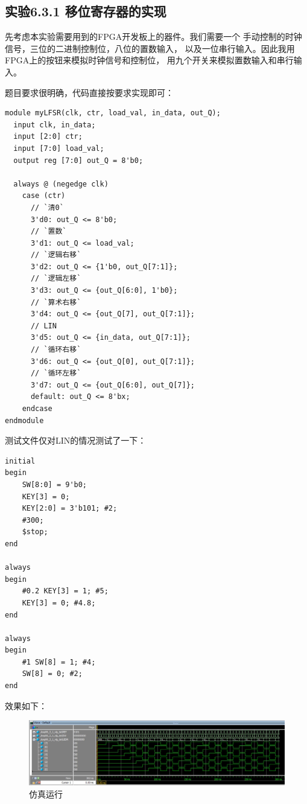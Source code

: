 \documentclass[12pt,a4paper,UTF8]{article}
\begin{document}
\subsection{实验6.3.1 移位寄存器的实现}
先考虑本实验需要用到的FPGA开发板上的器件。我们需要一个
手动控制的时钟信号，三位的二进制控制位，八位的置数输入，
以及一位串行输入。因此我用FPGA上的按钮来模拟时钟信号和控制位，
用九个开关来模拟置数输入和串行输入。

题目要求很明确，代码直接按要求实现即可：
\begin{lstlisting}[style=verilog-style]
module myLFSR(clk, ctr, load_val, in_data, out_Q);
  input clk, in_data;
  input [2:0] ctr;
  input [7:0] load_val;
  output reg [7:0] out_Q = 8'b0;

  always @ (negedge clk)
    case (ctr)
      // `清0`
      3'd0: out_Q <= 8'b0;
      // `置数`
      3'd1: out_Q <= load_val;
      // `逻辑右移`
      3'd2: out_Q <= {1'b0, out_Q[7:1]};
      // `逻辑左移`
      3'd3: out_Q <= {out_Q[6:0], 1'b0};
      // `算术右移`
      3'd4: out_Q <= {out_Q[7], out_Q[7:1]};
      // LIN
      3'd5: out_Q <= {in_data, out_Q[7:1]};
      // `循环右移`
      3'd6: out_Q <= {out_Q[0], out_Q[7:1]};
      // `循环左移`
      3'd7: out_Q <= {out_Q[6:0], out_Q[7]};
      default: out_Q <= 8'bx;
    endcase
endmodule
\end{lstlisting}

测试文件仅对LIN的情况测试了一下：
\begin{lstlisting}[style=verilog-style]
initial                                                
begin                                                  
	SW[8:0] = 9'b0;
	KEY[3] = 0;
	KEY[2:0] = 3'b101; #2;
	#300;
	$stop;
end

always
begin                                                  
	#0.2 KEY[3] = 1; #5;
	KEY[3] = 0; #4.8;
end

always
begin
	#1 SW[8] = 1; #4;
	SW[8] = 0; #2;
end
\end{lstlisting}

效果如下：
\begin{figure}[H]
  \centering
  \includegraphics[width=1\textwidth]{1_sim.JPG}
  \caption{仿真运行}
  \label{1_sim}
\end{figure}
\end{document}
